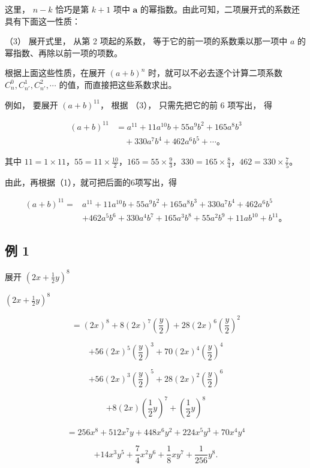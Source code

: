 这里， \(n - k\) 恰巧是第 \(k + 1\) 项中 \(\pmb{a}\)
的幂指数。由此可知，二项展开式的系数还具有下面这一性质：

（3） 展开式里， 从第 2 项起的系数， 等于它的前一项的系数乘以那一项中
\(a\) 的幂指数、再除以前一项的项数。

根据上面这些性质，在展开 \((a + b)^n\) 时，就可以不必去逐个计算二项系数
\(C_n^0, C_{n'}^1, C_{n'}^2, \cdots\) 的值，而直接把这些系数求出。

例如， 要展开 \((a + b)^{11}\)， 根据 （3）， 只需先把它的前 6 项写出，
得

\[
\begin{aligned}
(a+b)^{11}&=a^{11}+11a^{10}b+55a^9b^2+165a^8b^3\\
&\quad+330a^7b^4+462a^6b^5+\cdots\text{。}
\end{aligned}
\]

其中
\(11=1\times11\)，\(55=11\times\frac{10}{2}\)，\(165=55\times\frac{9}{3}\)，\(330=165\times\frac{8}{4}\)，\(462=330\times\frac{7}{5}\)。

由此，再根据（1），就可把后面的6项写出，得

\[
\begin{aligned}
(a+b)^{11}={}&a^{11}+11a^{10}b+55a^9b^2+165a^8b^3+330a^7b^4+462a^6b^5\\
&+462a^5b^6+330a^4b^7+165a^3b^8+55a^2b^9+11ab^{10}+b^{11}\text{。}
\end{aligned}
\]

\subsection{例 1}

展开 \(\left(2x + \frac{1}{2} y\right)^8\)

 \(\left(2x + \frac{1}{2} y\right)^8\)

\[
=(2x)^8+8(2x)^7\left(\frac y2\right)+28(2x)^6\left(\frac y2\right)^2
\]

\[
+56(2x)^5\left(\frac y2\right)^3+70(2x)^4\left(\frac y2\right)^4
\]

\[
+56(2x)^3\left(\frac y2\right)^5+28(2x)^2\left(\frac y2\right)^6
\]

\[
+ 8 (2 x) \left(\frac {1}{2} y\right) ^ {7} + \left(\frac {1}{2} y\right) ^ {8}
\]

\[
=256x^8+512x^7y+448x^6y^2+224x^5y^3+70x^4y^4
\]

\[
+ 14 x ^ {3} y ^ {5} + \frac {7}{4} x ^ {2} y ^ {6} + \frac {1}{8} x y ^ {7} + \frac {1}{256} y ^ {8}.
\]

